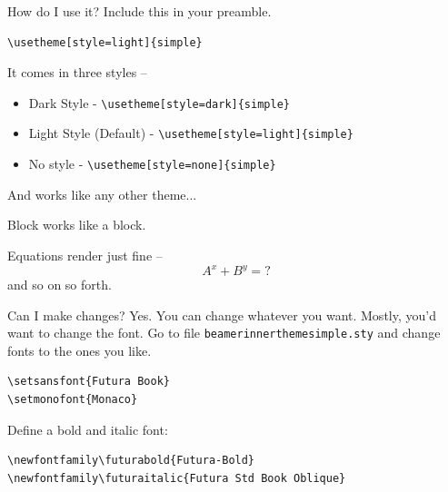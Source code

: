 \documentclass[xetex, aspectratio=169]{beamer}
\begin{document}
\begin{frame}[fragile]{How do I use it?}
	Include this in your preamble.
\begin{verbatim}
\usetheme[style=light]{simple} 
\end{verbatim}

It comes in	three styles --
\begin{itemize}
	\item Dark Style - \verb|\usetheme[style=dark]{simple} |
	\item \alert{Light Style (Default)}  - \verb|\usetheme[style=light]{simple} |
	\item No style - \verb|\usetheme[style=none]{simple} |
\end{itemize}

And works like any other theme...

\begin{block}{Block}
works like a block.
\end{block}

Equations render just fine -- 
\begin{equation}
A^x + B^y = ?
\end{equation}
and so on so forth.
\end{frame}

\begin{frame}[fragile]{Can I make changes?}
Yes. You can change whatever you want. Mostly, you'd want to change the font. Go to file \verb|beamerinnerthemesimple.sty| and change fonts to the ones you like.
\begin{verbatim}
\setsansfont{Futura Book}
\setmonofont{Monaco}
\end{verbatim}
Define a bold and italic font:
\begin{verbatim}
\newfontfamily\futurabold{Futura-Bold}
\newfontfamily\futuraitalic{Futura Std Book Oblique}
\end{verbatim}
\end{frame}

\begin{frame}
	\vspace{2\baselineskip}
\end{frame}
\end{document}
